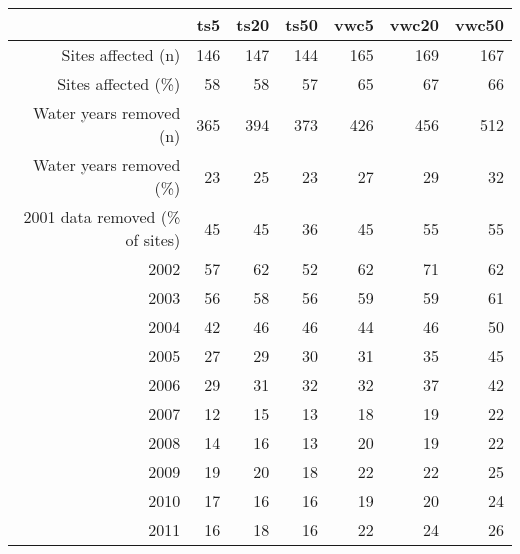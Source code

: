 \begin{table}[ht]
\centering
\begin{tabular}{rrrrrrr}
  \hline
 & ts5 & ts20 & ts50 & vwc5 & vwc20 & vwc50 \\ 
  \hline
Sites affected (n) & 146 & 147 & 144 & 165 & 169 & 167 \\ 
  Sites affected (\%) & 58 & 58 & 57 & 65 & 67 & 66 \\ 
  Water years removed (n) & 365 & 394 & 373 & 426 & 456 & 512 \\ 
  Water years removed (\%) & 23 & 25 & 23 & 27 & 29 & 32 \\ 
  2001 data removed (\% of sites) & 45 & 45 & 36 & 45 & 55 & 55 \\ 
  2002 & 57 & 62 & 52 & 62 & 71 & 62 \\ 
  2003 & 56 & 58 & 56 & 59 & 59 & 61 \\ 
  2004 & 42 & 46 & 46 & 44 & 46 & 50 \\ 
  2005 & 27 & 29 & 30 & 31 & 35 & 45 \\ 
  2006 & 29 & 31 & 32 & 32 & 37 & 42 \\ 
  2007 & 12 & 15 & 13 & 18 & 19 & 22 \\ 
  2008 & 14 & 16 & 13 & 20 & 19 & 22 \\ 
  2009 & 19 & 20 & 18 & 22 & 22 & 25 \\ 
  2010 & 17 & 16 & 16 & 19 & 20 & 24 \\ 
  2011 & 16 & 18 & 16 & 22 & 24 & 26 \\ 
   \hline
\end{tabular}
\end{table}
